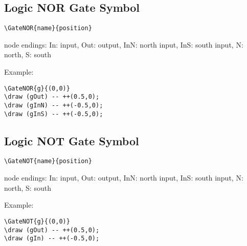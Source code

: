 \documentclass[parskip=full]{scrartcl}
\begin{document}
\subsection{Logic NOR Gate Symbol}

\begin{verbatim}
\GateNOR{name}{position}
\end{verbatim}
node endings: In: input, Out: output,
              InN: north input, InS: south input,
              N: north, S: south

Example:\\
\begin{minipage}{0.8\textwidth}
\begin{verbatim}
\GateNOR{g}{(0,0)}
\draw (gOut) -- ++(0.5,0);
\draw (gInN) -- ++(-0.5,0);
\draw (gInS) -- ++(-0.5,0);
\end{verbatim}
\end{minipage}
\begin{minipage}{0.19\textwidth}
\end{minipage}

\subsection{Logic NOT Gate Symbol}

\begin{verbatim}
\GateNOT{name}{position}
\end{verbatim}
node endings: In: input, Out: output,
              InN: north input, InS: south input,
              N: north, S: south

Example:\\
\begin{minipage}{0.8\textwidth}
\begin{verbatim}
\GateNOT{g}{(0,0)}
\draw (gOut) -- ++(0.5,0);
\draw (gIn) -- ++(-0.5,0);
\end{verbatim}
\end{minipage}
\begin{minipage}{0.19\textwidth}
\end{minipage}
\end{document}
